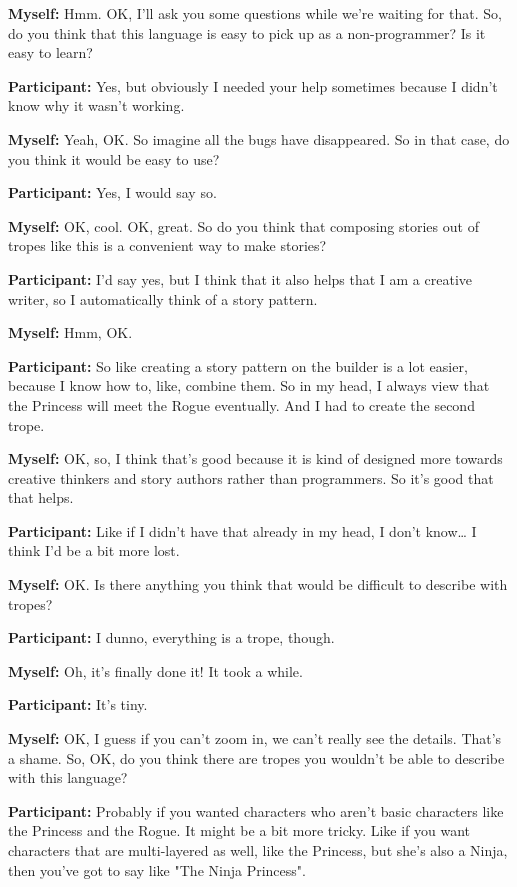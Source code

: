 \documentclass[11pt]{report}
\newcommand{\llabel}[1]{\hypertarget{llineno:#1}{\linelabel{#1}}}
\begin{document}
\begin{linenumbers}
\textbf{Myself:} Hmm. OK, I'll ask you some questions while we're waiting for that. So, do you think that this language is easy to pick up as a non-programmer? Is it easy to learn?

\textbf{Participant:} Yes, but obviously I needed your help sometimes because I didn't know why it wasn't working.

\textbf{Myself:} Yeah, OK. So imagine all the bugs have disappeared. So in that case, do you think it would be easy to use?

\textbf{Participant:} Yes, I would say so.

\textbf{Myself:} OK, cool. OK, great. So do you think that composing stories out of tropes like this is a convenient way to make stories?

\textbf{Participant:} I'd say yes, but I think that it also helps that I am a creative writer, so I automatically think of a story pattern.\llabel{lne:use3c}

\textbf{Myself:} Hmm, OK.

\textbf{Participant:} So like creating a story pattern on the builder is a lot easier, because I know how to, like, combine them. So in my head, I always view that the Princess will meet the Rogue eventually. And I had to create the second trope.\llabel{lne:use3c2}

\textbf{Myself:} OK, so, I think that's good because it is kind of designed more towards creative thinkers and story authors rather than programmers. So it's good that that helps.

\textbf{Participant:} Like if I didn't have that already in my head, I don't know\ldots{} I think I'd be a bit more lost.

\textbf{Myself:} OK. Is there anything you think that would be difficult to describe with tropes?

\textbf{Participant:} I dunno, everything is a trope, though.

\textbf{Myself:} Oh, it's finally done it! It took a while.

\textbf{Participant:} It's tiny.

\textbf{Myself:} OK, I guess if you can't zoom in, we can't really see the details. That's a shame. So, OK, do you think there are tropes you wouldn't be able to describe with this language?

\textbf{Participant:} Probably if you wanted characters who aren't basic characters like the Princess and the Rogue. It might be a bit more tricky. Like if you want characters that are multi-layered as well, like the Princess, but she's also a Ninja, then you've got to say like "The Ninja Princess".


\end{linenumbers}
\end{document}
